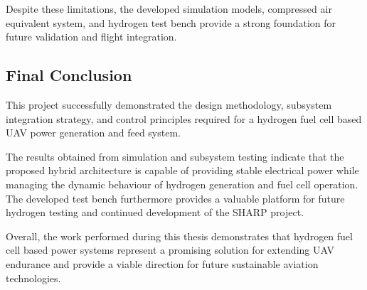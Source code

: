 Despite these limitations, the developed simulation models, compressed air equivalent system, and hydrogen test bench provide a strong foundation for future validation and flight integration.


\subsection*{Final Conclusion}
This project successfully demonstrated the design methodology, subsystem integration strategy, and control principles required for a hydrogen fuel cell based UAV power generation and feed system.

The results obtained from simulation and subsystem testing indicate that the proposed hybrid architecture is capable of providing stable electrical power while managing the dynamic behaviour of hydrogen generation and fuel cell operation. The developed test bench furthermore provides a valuable platform for future hydrogen testing and continued development of the SHARP project.

Overall, the work performed during this thesis demonstrates that hydrogen fuel cell based power systems represent a promising solution for extending UAV endurance and provide a viable direction for future sustainable aviation technologies.
\newpage
